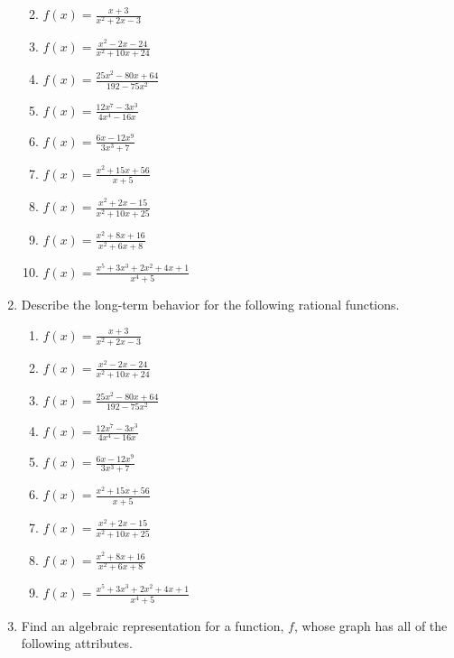 \documentclass[
]{book}
\providecommand{\tightlist}{%
  \setlength{\itemsep}{0pt}\setlength{\parskip}{0pt}}
\theoremstyle{definition}
\theoremstyle{definition}
\theoremstyle{definition}
\theoremstyle{remark}
\begin{document}
\begin{enumerate}
  \begin{enumerate}
  \def\labelenumii{\alph{enumii}.}
  \tightlist
  \item
    \({\displaystyle f(x)=\frac{x+3}{x^2+2x-3} }\)
  \item
    \({\displaystyle f(x)=\frac{x^2-2x-24}{x^2+10x+24} }\)
  \item
    \({\displaystyle f(x)=\frac{25x^2-80x+64}{192-75x^2} }\)
  \item
    \({\displaystyle f(x)=\frac{12x^7-3x^3}{4x^4-16x} }\)
  \item
    \({\displaystyle f(x)=\frac{6x-12x^9}{3x^3+7} }\)
  \item
    \({\displaystyle f(x)=\frac{x^2+15x+56}{x+5} }\)
  \item
    \({\displaystyle f(x)=\frac{x^2+2x-15}{x^2+10x+25} }\)
  \item
    \({\displaystyle f(x)=\frac{x^2+8x+16}{x^2+6x+8} }\)
  \item
    \({\displaystyle f(x)=\frac{x^5+3x^3+2x^2+4x+1}{x^4+5} }\)
  \end{enumerate}
\item
  Describe the long-term behavior for the following rational functions.

  \begin{enumerate}
  \def\labelenumii{\alph{enumii}.}
  \tightlist
  \item
    \({\displaystyle f(x)=\frac{x+3}{x^2+2x-3} }\)
  \item
    \({\displaystyle f(x)=\frac{x^2-2x-24}{x^2+10x+24} }\)
  \item
    \({\displaystyle f(x)=\frac{25x^2-80x+64}{192-75x^2} }\)
  \item
    \({\displaystyle f(x)=\frac{12x^7-3x^3}{4x^4-16x} }\)
  \item
    \({\displaystyle f(x)=\frac{6x-12x^9}{3x^3+7} }\)
  \item
    \({\displaystyle f(x)=\frac{x^2+15x+56}{x+5} }\)
  \item
    \({\displaystyle f(x)=\frac{x^2+2x-15}{x^2+10x+25} }\)
  \item
    \({\displaystyle f(x)=\frac{x^2+8x+16}{x^2+6x+8} }\)
  \item
    \({\displaystyle f(x)=\frac{x^5+3x^3+2x^2+4x+1}{x^4+5} }\)
  \end{enumerate}
\item
  Find an algebraic representation for a function, \(f\), whose graph has all of the following attributes.


\end{enumerate}
\end{document}
